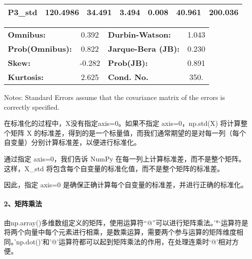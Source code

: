 \documentclass[11pt]{article}
\makeatletter
\newcommand{\boxspacing}{\kern\kvtcb@left@rule\kern\kvtcb@boxsep}
\newcommand{\prompt}[4]{
        {\ttfamily\llap{{\color{#2}[#3]:\hspace{3pt}#4}}\vspace{-\baselineskip}}
    }
\makeatother
\begin{document}
\begin{center}
\begin{tabular}{lcccccc}
\textbf{P3\_std}   &     120.4986  &       34.491     &     3.494  &         0.008        &       40.961    &      200.036     \\
\bottomrule
\end{tabular}
\begin{tabular}{lclc}
\textbf{Omnibus:}       &  0.392 & \textbf{  Durbin-Watson:     } &    1.043  \\
\textbf{Prob(Omnibus):} &  0.822 & \textbf{  Jarque-Bera (JB):  } &    0.230  \\
\textbf{Skew:}          & -0.282 & \textbf{  Prob(JB):          } &    0.891  \\
\textbf{Kurtosis:}      &  2.625 & \textbf{  Cond. No.          } &     350.  \\
\bottomrule
\end{tabular}
\end{center}

Notes: \newline
 [1] Standard Errors assume that the covariance matrix of the errors is correctly specified.

    

    在标准化的过程中，X没有指定axis=0。如果不指定 axis=0，np.std(X)
将计算整个矩阵 X
的标准差，得到的是一个标量值，而我们通常期望的是对每一列（每个自变量）分别计算标准差，以便进行标准化。

通过指定 axis=0，我们告诉 NumPy
在每一列上计算标准差，而不是整个矩阵。这样，X\_std
将包含每个自变量的标准化值，而不是整个矩阵的标准差。

因此，指定 axis=0 是确保正确计算每个自变量的标准差，并进行正确的标准化。

    \hypertarget{ux77e9ux9635ux4e58ux6cd5}{%
\paragraph{2、矩阵乘法}\label{ux77e9ux9635ux4e58ux6cd5}}

    由np.array()多维数组定义的矩阵，使用运算符``@''可以进行矩阵乘法。'*`运算符是将两个向量中每个元素进行相乘，是数乘运算，需要两个参与运算的矩阵维度相同。'np.dot()'和'@'运算符都可以起到矩阵乘法的作用，在处理连乘时`@'相对方便。

    \begin{tcolorbox}[breakable, size=fbox, boxrule=1pt, pad at break*=1mm,colback=cellbackground, colframe=cellborder]
\prompt{In}{incolor}{ }{\boxspacing}
\begin{Verbatim}[commandchars=\\\{\}]

\end{Verbatim}
\end{tcolorbox}


    
    
    
\end{document}

